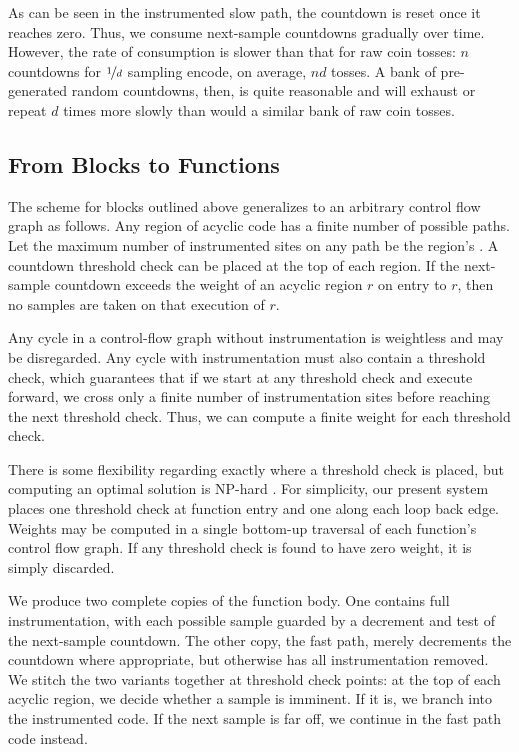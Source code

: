 As can be seen in the instrumented slow path, the countdown is reset
once it reaches zero.  Thus, we consume next-sample countdowns
gradually over time.  However, the rate of consumption is slower than
that for raw coin tosses: $n$ countdowns for $\nicefrac{1}{d}$
sampling encode, on average, $nd$ tosses.  A bank of pre-generated
random countdowns, then, is quite reasonable and will exhaust or
repeat $d$ times more slowly than would a similar bank of raw coin
tosses.

\subsection{From Blocks to Functions}

The scheme for blocks outlined above generalizes to an arbitrary
control flow graph as follows.  Any region of acyclic code has a
finite number of possible paths.  Let the maximum number of
instrumented sites on any path be the region's .
A countdown threshold check can be placed at the top of each
region.  If the next-sample countdown exceeds the weight of an 
acyclic region $r$ on entry to $r$,
then no samples are taken on that execution of $r$.

Any cycle in a control-flow graph without instrumentation is
weightless and may be disregarded.  Any cycle with
instrumentation must also contain a threshold check, which guarantees
that if we start at any threshold check and execute forward, we cross
only a finite number of instrumentation sites before reaching the next
threshold check.  Thus, we can compute a finite weight for each
threshold check.

There is some flexibility regarding exactly where a threshold check is
placed, but computing an optimal solution is NP-hard
\cite{Hirzel:2001:BT-FLOTP}.  For simplicity, our present system
places one threshold check at function entry and one along each loop
back edge.  Weights may be computed in a single bottom-up traversal of
each function's control flow graph.  If any threshold check is found
to have zero weight, it is simply discarded.

We produce two complete copies of the function body.  One contains
full instrumentation, with each possible sample guarded by a decrement
and test of the next-sample countdown.  The other copy, the fast path,
merely decrements the countdown where appropriate, but otherwise has
all instrumentation removed.  We stitch the two variants together at
threshold check points: at the top of each acyclic region, we decide
whether a sample is imminent.  If it is, we branch into the
instrumented code.  If the next sample is far off, we continue in the
fast path code instead.

